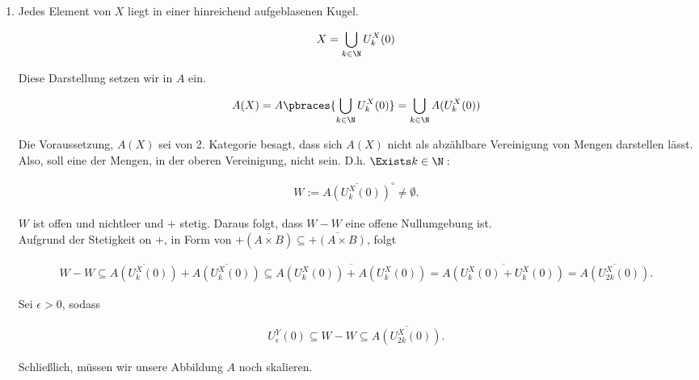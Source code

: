 \begin{solution}

\phantom{}

\begin{enumerate}[label = (\roman*)]

  \item
  Jedes Element von $X$ liegt in einer hinreichend aufgeblasenen Kugel.

  \begin{align*}
    X = \bigcup_{k \in \N} U_k^X(0)
  \end{align*}

  Diese Darstellung setzen wir in $A$ ein.

  \begin{align*}
    A(X)
    =
    A \pbraces
    {
      \bigcup_{k \in \N}
      U_k^X(0)
    }
    =
    \bigcup_{k \in \N}
    A(U_k^X(0))
  \end{align*}

  Die Voraussetzung, $A(X)$ sei von 2. Kategorie besagt, dass sich $A(X)$ nicht als abzählbare Vereinigung von  Mengen darstellen lässt.
  Also, soll eine der Mengen, in der oberen Vereinigung, nicht  sein.
  D.h. $\Exists k \in \N:$

  \begin{align*}
    W := \overline{A(U_k^X(0))}^\circ \neq \emptyset.
  \end{align*}

  $W$ ist offen und nichtleer und $+$ stetig.
  Daraus folgt, dass $W - W$ eine offene Nullumgebung ist. \\

  Aufgrund der Stetigkeit on $+$, in Form von $+(\overline{A \times B}) \subseteq \overline{+(A \times B)}$, folgt

  \begin{align*}
    W - W
    \subseteq
    \overline{A(U_k^X(0))} + \overline{A(U_k^X(0))}
    \subseteq
    \overline{A(U_k^X(0)) + A(U_k^X(0))}
    =
    \overline{A(U_k^X(0) + U_k^X(0))}
    =
    \overline{A(U_{2k}^X(0))}.
  \end{align*}

  Sei $\epsilon > 0$, sodass

  \begin{align*}
    U_{\epsilon}^Y(0)
    \subseteq
    W - W
    \subseteq
    \overline{A(U_{2k}^X(0))}.
  \end{align*}

  Schließlich, müssen wir unsere Abbildung $A$ noch skalieren.


\end{enumerate}
\end{solution}

